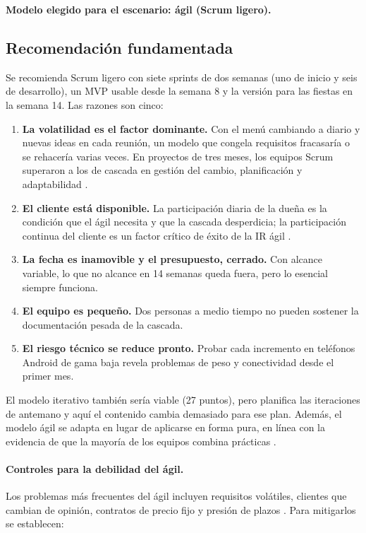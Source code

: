 \documentclass[11pt,a4paper]{article}
\begin{document}
\noindent\textbf{Modelo elegido para el escenario: ágil (Scrum ligero).}

\subsection{Recomendación fundamentada}

Se recomienda Scrum ligero con siete sprints de dos semanas (uno de inicio y
seis de desarrollo), un MVP usable desde la semana 8 y la versión para las
fiestas en la semana 14. Las razones son cinco:

\begin{enumerate}
  \item \textbf{La volatilidad es el factor dominante.} Con el menú cambiando
  a diario y nuevas ideas en cada reunión, un modelo que congela requisitos
  fracasaría o se rehacería varias veces. En proyectos de tres meses, los
  equipos Scrum superaron a los de cascada en gestión del cambio,
  planificación y adaptabilidad \cite{mex2025}.
  \item \textbf{El cliente está disponible.} La participación diaria de la
  dueña es la condición que el ágil necesita y que la cascada desperdicia;
  la participación continua del cliente es un factor crítico de éxito de la
  IR ágil \cite{schon2017}.
  \item \textbf{La fecha es inamovible y el presupuesto, cerrado.} Con
  alcance variable, lo que no alcance en 14 semanas queda fuera, pero lo
  esencial siempre funciona.
  \item \textbf{El equipo es pequeño.} Dos personas a medio tiempo no pueden
  sostener la documentación pesada de la cascada.
  \item \textbf{El riesgo técnico se reduce pronto.} Probar cada incremento
  en teléfonos Android de gama baja revela problemas de peso y conectividad
  desde el primer mes.
\end{enumerate}

El modelo iterativo también sería viable (27 puntos), pero planifica las
iteraciones de antemano y aquí el contenido cambia demasiado para ese plan.
Además, el modelo ágil se adapta en lugar de aplicarse en forma pura, en
línea con la evidencia de que la mayoría de los equipos combina prácticas
\cite{kuhrmann2022}.

\paragraph{Controles para la debilidad del ágil.}
Los problemas más frecuentes del ágil incluyen requisitos volátiles, clientes
que cambian de opinión, contratos de precio fijo y presión de plazos
\cite{meckenstock2024}. Para mitigarlos se establecen:
\end{document}
